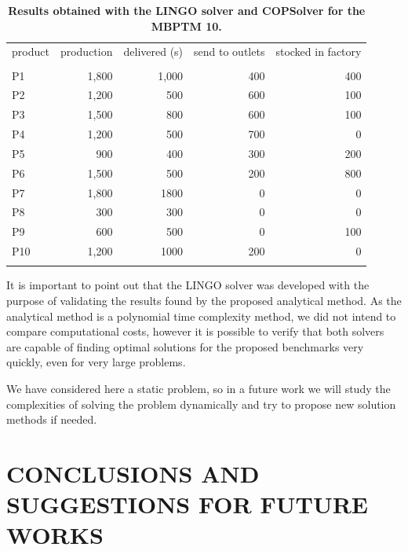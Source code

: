 \documentclass[10pt,fleqn,a4paper,twoside]{article}
\begin{document}
\begin{table}[ht]
\begin{center}
\caption{\textbf{Results obtained with the LINGO solver and COPSolver for the MBPTM 10.}}
\begin{footnotesize}
\begin{tabular}[c]{l r r r r}
\\
product & production & delivered (s) & send to outlets & stocked in factory \\
\cline {1-5} \\
P1 & 1,800 & 1,000 & 400 & 400 \\
P2 & 1,200 & 500 & 600 & 100 \\
P3 & 1,500 & 800 & 600 & 100 \\
P4 & 1,200 & 500 & 700 & 0 \\
P5 & 900 & 400 & 300 & 200 \\
P6 & 1,500 & 500 & 200 & 800 \\
P7 & 1,800 & 1800 & 0 & 0 \\
P8 & 300 & 300 & 0 & 0 \\
P9 & 600 & 500 & 0 & 100 \\
P10 & 1,200 & 1000 & 200 & 0 \\
\cline {1-5} \\
\end{tabular}
\label{tab:compResultsMBPTMP3}
\end{footnotesize}
\end{center}
\end{table}

It is important to point out that the LINGO solver was developed with the purpose of validating the results found by the proposed analytical method. As the analytical method is a polynomial time complexity method, we did not intend to compare computational costs, however it is possible to verify that both solvers are capable of finding optimal solutions for the proposed benchmarks very quickly, even for very large problems.

We have considered here a static problem, so in a future work we will study the complexities of solving the problem dynamically and try to propose new solution methods if needed. 

\section{CONCLUSIONS AND SUGGESTIONS FOR FUTURE WORKS}
\label{sec:conclusions}
\end{document}
